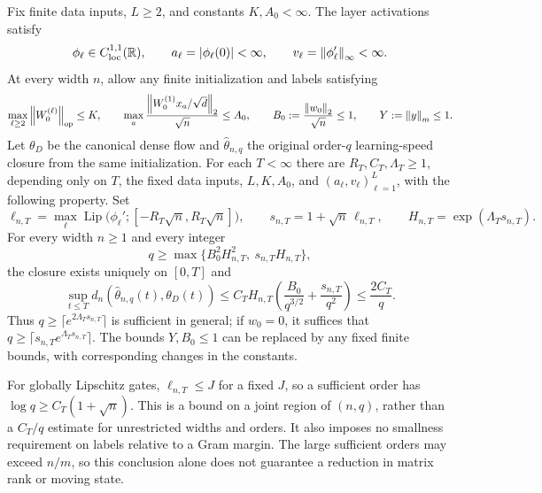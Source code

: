 \begin{proposition}
\label{thm:finite-time-uniform}
\label{prop:trial-finite-time}
Fix finite data inputs, $L\ge2$, and constants $K,A_0<\infty$.
The layer activations satisfy
\[
 \phi_\ell\in C^{1,1}_{\mathrm{loc}}(\mathbb{R}),\qquad
 a_\ell=|\phi_\ell(0)|<\infty,\qquad
 v_\ell=\left\lVert \phi_\ell'\right\rVert_\infty<\infty.
\]
At every width $n$, allow any finite initialization and labels satisfying
\begin{equation}
 \max_{\ell\ge2}\left\lVert W_0^{(\ell)}\right\rVert_{\mathrm{op}}\le K,\qquad
 \max_a\frac{\left\lVert W_0^{(1)}x_a/\sqrt d\right\rVert_2}{\sqrt n}\le A_0,
 \qquad B_0:=\frac{\left\lVert w_0\right\rVert_2}{\sqrt n}\le1,
 \qquad Y:=\left\lVert y\right\rVert_m\le1.
 \label{eq:ft-initial}
\end{equation}
Let $\theta_D$ be the canonical dense flow and $\widehat\theta_{n,q}$
the original order-$q$ learning-speed closure from the same initialization.
For each $T<\infty$ there are $R_T,C_T,\Lambda_T\ge1$, depending only
on $T$, the fixed data inputs, $L,K,A_0$, and $(a_\ell,v_\ell)_{\ell=1}^L$,
with the following property.  Set
\begin{equation}
 \ell_{n,T}=\max_\ell\operatorname{Lip}
   \bigl(\phi_\ell';[-R_T\sqrt n,R_T\sqrt n]\bigr),\qquad
 s_{n,T}=1+\sqrt n\,\ell_{n,T},\qquad
 H_{n,T}=\exp(\Lambda_Ts_{n,T}).
 \label{eq:ft-modulus}
\end{equation}
For every width $n\ge1$ and every integer
\begin{equation}
 q\ge\max\{B_0^2H_{n,T}^2,\ s_{n,T}H_{n,T}\},
 \label{eq:ft-order}
\end{equation}
the closure exists uniquely on $[0,T]$ and
\begin{equation}
 \sup_{t\le T}d_n(\widehat\theta_{n,q}(t),\theta_D(t))
 \le C_TH_{n,T}\left(\frac{B_0}{q^{3/2}}
                       +\frac{s_{n,T}}{q^2}\right)
 \le\frac{2C_T}{q}.
 \label{eq:ft-tracking}
\end{equation}
Thus $q\ge\lceil e^{2\Lambda_Ts_{n,T}}\rceil$ is sufficient in general;
if $w_0=0$, it suffices that
$q\ge\lceil s_{n,T}e^{\Lambda_Ts_{n,T}}\rceil$.
The bounds $Y,B_0\le1$ can be replaced by any fixed finite bounds,
with corresponding changes in the constants.
\end{proposition}

For globally Lipschitz gates, $\ell_{n,T}\le J$ for a fixed $J$, so a
sufficient order has $\log q\ge C_T(1+\sqrt n)$.
This is a bound on a joint region of $(n,q)$, rather than a
$C_T/q$ estimate for unrestricted widths and orders.  It also imposes no
smallness requirement on labels relative to a Gram margin.  The large
sufficient orders may exceed $n/m$, so this conclusion alone does not
guarantee a reduction in matrix rank or moving state.

